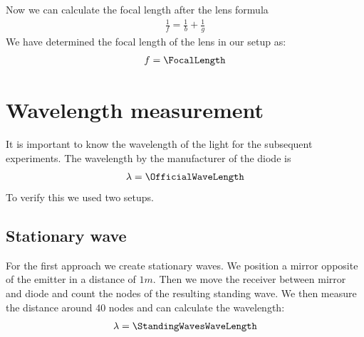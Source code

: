 \documentclass[a4paper,10pt,twocolumn]{article}
\begin{document}
    Now we can calculate the focal length after the lens formula
    \begin{align}
        \label{eq:LensFormula}
        \frac{1}{f} = \frac{1}{b} + \frac{1}{g}
    \end{align}
    We have determined the focal length of the lens in our setup as:
    \begin{align*}
        f = \FocalLength
    \end{align*}
    \section{Wavelength measurement}
    It is important to know the wavelength of the light for the subsequent experiments.
    The wavelength by the manufacturer of the diode is
    \begin{align*}
        \lambda = \OfficialWaveLength
    \end{align*}
    To verify this we used two setups.
    \subsection{Stationary wave}
    For the first approach we create stationary waves.
    We position a mirror opposite of the emitter in a distance of $1m$.
    Then we move the receiver between mirror and diode and count the nodes of the resulting standing wave.
    We then measure the distance around 40 nodes and can calculate the wavelength:
    \begin{align*}
        \lambda = \StandingWavesWaveLength
    \end{align*}
\end{document}
